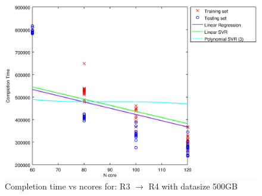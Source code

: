 
\begin {figure}[hbtp]
\centering
\includegraphics[width=\textwidth]{output/R3_R4_500_ALL_FEATURES/plot_R3_R4_500_bestmodels.eps}
\caption{Completion time vs ncores for: R3 $\rightarrow$ R4 with datasize 500GB}
\label{fig:coreonly_linear_R3_R4_500}
\end {figure}
